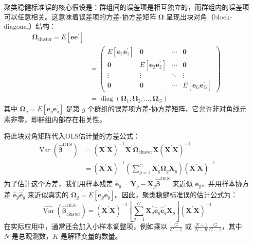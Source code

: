 聚类稳健标准误的核心假设是：群组间的误差项是相互独立的，而群组内的误差项可以任意相关。这意味着误差项的方差-协方差矩阵 $\pmb{\Omega}$ 呈现出块对角（block-diagonal）结构：
\begin{equation}
	\begin{split}
		\pmb{\Omega}_{\text{cluster}} = E[\pmb{e}\pmb{e}^{\prime}] \\
		&= \begin{pmatrix} 
		E[\pmb{e}_1\pmb{e}_1^{\prime}] & \pmb{0} & \cdots & \pmb{0} \\
		\pmb{0} & E[\pmb{e}_2\pmb{e}_2^{\prime}] & \cdots & \pmb{0} \\
		\vdots & \vdots & \ddots & \vdots \\
		\pmb{0} & \pmb{0} & \cdots & E[\pmb{e}_G\pmb{e}_G^{\prime}]
		\end{pmatrix} \\
		&= \operatorname{diag}(\pmb{\Omega}_1, \pmb{\Omega}_2, \dots, \pmb{\Omega}_G)
	\end{split}
\end{equation}
其中 $\pmb{\Omega}_g = E[\pmb{e}_g\pmb{e}_g^{\prime}]$ 是第 $g$ 个群组的误差项方差-协方差矩阵，它允许非对角线元素非零，即群组内部存在相关性。

将此块对角矩阵代入OLS估计量的方差公式：
\begin{equation}
	\begin{split}
		\operatorname{Var} \left( \hat{\pmb{\beta}}^{\text{OLS}} \right) &= (\pmb{X}^{\prime}\pmb{X})^{-1} \pmb{X}^{\prime} \pmb{\Omega}_{\text{cluster}} \pmb{X} (\pmb{X}^{\prime}\pmb{X})^{-1} \\
		&= (\pmb{X}^{\prime}\pmb{X})^{-1} \left( \sum_{g=1}^{G} \pmb{X}_g^{\prime} \pmb{\Omega}_g \pmb{X}_g \right) (\pmb{X}^{\prime}\pmb{X})^{-1}
	\end{split}
\end{equation}
为了估计这个方差，我们用样本残差 $\hat{\pmb{e}}_g = \pmb{Y}_g - \pmb{X}_g \hat{\pmb{\beta}}^{\text{OLS}}$ 来近似 $\pmb{e}_g$，并用样本协方差 $\hat{\pmb{e}}_g \hat{\pmb{e}}_g^{\prime}$ 来近似真实的 $\pmb{\Omega}_g = E[\pmb{e}_g\pmb{e}_g^{\prime}]$。因此，聚类稳健标准误的估计公式为：
\begin{equation}
	\widehat{\operatorname{Var}} \left( \hat{\pmb{\beta}}_{\text{cluster}}^{\text{OLS}} \right) = (\pmb{X}^{\prime}\pmb{X})^{-1} \left[ \sum_{g=1}^{G} \pmb{X}_{g}^{\prime} \hat{\pmb{e}}_{g} \hat{\pmb{e}}_{g}^{\prime} \pmb{X}_{g} \right] (\pmb{X}^{\prime}\pmb{X})^{-1}
\end{equation}
在实际应用中，通常还会加入小样本调整项，例如乘以 $\frac{G}{G-1}$ 或 $\frac{N-1}{N-K} \frac{G}{G-1}$，其中 $N$ 是总观测数，$K$ 是解释变量的数量。

